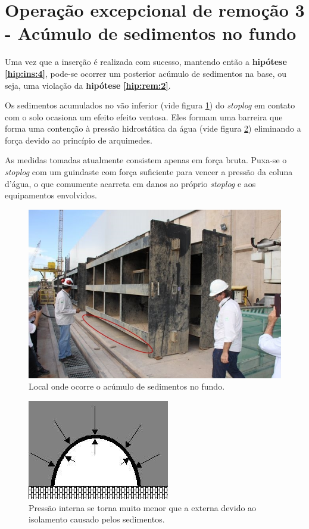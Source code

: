 \section{Operação excepcional de remoção 3 - Acúmulo de sedimentos no fundo}
\label{op:rem:3}
Uma vez que a inserção é realizada com sucesso, mantendo então a \textbf{hipótese}
\textbf{\ref{hip:ins:4}}, pode-se ocorrer um posterior acúmulo de sedimentos na
base, ou seja, uma violação da \textbf{hipótese} \textbf{\ref{hip:rem:2}}.

Os sedimentos acumulados no vão inferior (vide figura \ref{fig:op:rem:3_1}) do
\emph{stoplog} em contato com o solo ocasiona um efeito efeito ventosa. Eles
formam uma barreira que forma uma contenção à pressão hidrostática da água (vide
figura \ref{fig:op:rem:3_2})  eliminando a força devido ao princípio de
arquimedes.

As medidas tomadas atualmente consistem apenas em força bruta. Puxa-se o
\emph{stoplog} com um guindaste com força suficiente para vencer a pressão da
coluna d'água, o que comumente acarreta em danos ao próprio \emph{stoplog} e aos
equipamentos envolvidos.

\begin{figure}[h!]
    \centering
    \includegraphics[width=0.6\columnwidth]{figs/modos/op_rem_3/op_rem_3_1.jpg}
    \caption{Local onde ocorre o acúmulo de sedimentos no fundo.}
    \label{fig:op:rem:3_1}
\end{figure}


\begin{figure}[h!]
    \centering
    \includegraphics[width=0.6\columnwidth]{figs/modos/op_rem_3/op_rem_3_2.jpg}
    \caption{Pressão interna se torna muito menor que a externa devido ao
    isolamento causado pelos sedimentos.}
    \label{fig:op:rem:3_2}
\end{figure}


